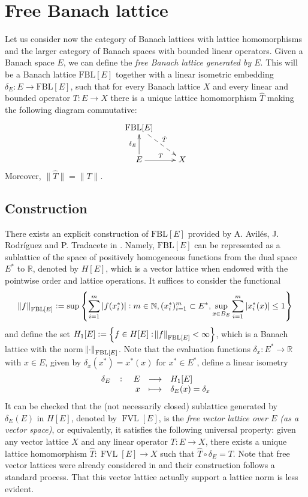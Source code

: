 \documentclass[12pt,leqno]{amsart}
\numberwithin{equation}{section} %
\theoremstyle{definition}
\numberwithin{equation}{section}
\newcommand{\N}{\mathbb{N}}
\newcommand{\R}{\mathbb{R}}
\newcommand{\fbl}{\mathrm{FBL}}
\DeclareMathOperator{\FVL}{FVL}
\newcommand{\nFBLE}[1]{\norm{#1}_{\mathrm{FBL}[E]}}
\begin{document}
\section{Free Banach lattice}\label{sec:fbl}

Let us consider now the category of Banach lattices with lattice homomorphisms and the larger category of Banach spaces with bounded linear operators. Given a Banach space $E$, we can define the \textit{free Banach lattice generated by $E$}. This will be a Banach lattice $\fbl[E]$ together with a linear isometric embedding $\delta_E:E\rightarrow \fbl[E]$, such that for every Banach lattice $X$ and every linear and bounded operator $T:E\rightarrow X$ there is a unique lattice homomorphism $\hat T$ making the following diagram commutative:
$$
\xymatrix{\fbl[E]\ar@{-->}[rd]^{\hat{T}}&\\
     E\ar[r]^{T}\ar^{\delta_E}[u]& X}
$$
Moreover, $\|\hat{T}\|=\|T\|$.\\

\subsection{Construction} 
There exists an explicit construction of $\fbl[E]$ provided by A. Avil\'es, J. Rodr\'iguez and P. Tradacete in \cite{ART}. Namely, $\fbl[E]$ can be represented as a sublattice of the space of positively homogeneous functions from the dual space $E^*$ to $\R$, denoted by $H[E]$, which is a vector lattice when endowed with the pointwise order and lattice operations. It suffices to consider the functional
\begin{equation}\label{equa: norm H1E}
	\nFBLE{f}:=\sup \cbr{\sum_{i=1}^m \abs[0]{f(x_i^*)}:m\in \N, (x_i^*)_{i=1}^m\subset E^*, \sup_{x\in B_E} \sum_{i=1}^m \abs[0]{x_i^*(x)}\leq 1}
\end{equation}
and define the set $H_1[E]:=\cbr{f\in H[E]: \nFBLE{f}<\infty}$, which is a Banach lattice with the norm $\nFBLE{\cdot}$. Note that the evaluation functions $\delta_x:E^*\rightarrow \R$ with $x\in E$, given by $\delta_x(x^*)=x^*(x)$ for $x^*\in E^*$, define a linear isometry
\begin{equation*}
    \fullfunction{\delta_E}{E}{H_1[E]}{x}{\delta_E(x)=\delta_x}
\end{equation*}
It can be checked that the (not necessarily closed) sublattice generated by $\delta_E(E)$ in $H[E]$, denoted by $\FVL[E]$, is the \textit{free vector lattice over $E$ (as a vector space)}, or equivalently, it satisfies the following universal property: given any vector lattice $X$ and any linear operator $T:E\rightarrow X$, there exists a unique lattice homomorphism $\hat{T}:\FVL[E]\rightarrow X$ such that $\hat{T}\circ \delta_E=T$. Note that free vector lattices were already considered in \cite{Baker, Bleier} and their construction follows a standard process. That this vector lattice actually support a lattice norm is less evident. \\
\end{document}
